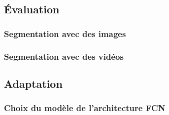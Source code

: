 \subsection{Évaluation}

\subsubsection{Segmentation avec des images}

\subsubsection{Segmentation avec des vidéos}

\subsection{Adaptation}

\subsubsection{Choix du modèle de l'architecture FCN}
\label{section:choix_modele_architecture}
% 
% 